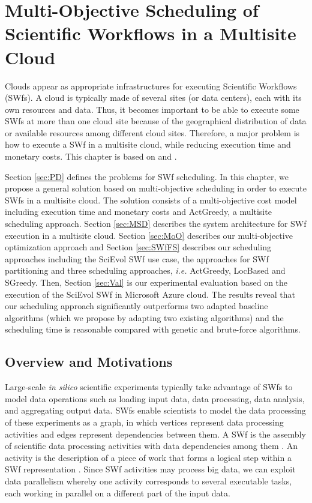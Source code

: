 \chapter{Multi-Objective Scheduling of Scientific Workflows in a Multisite Cloud} \label{MOSSWMC}


Clouds appear as appropriate infrastructures for executing Scientific Workflows (SWfs). 
A cloud is typically made of several sites (or data centers), each with its own resources and data.
Thus, it becomes important to be able to execute some SWfs at more than one cloud site because of the geographical distribution of data or available resources among different cloud sites.
Therefore, a major problem is how to execute a SWf in a multisite cloud, while reducing execution time and monetary costs. This chapter is based on \cite{Liu16} and \cite{Liu2016a}.

Section \ref{sec:PD} defines the problems for SWf scheduling. 
In this chapter, we propose a general solution based on multi-objective scheduling in order to execute SWfs in a multisite cloud. 
The solution consists of a multi-objective cost model including execution time and monetary costs and ActGreedy, a multisite scheduling approach. 
Section \ref{sec:MSD} describes the system architecture for SWf execution in a multisite cloud.
Section \ref{sec:MoO} describes our multi-objective optimization approach and
Section \ref{sec:SWfFS} describes our scheduling approaches including the SciEvol SWf use case, the approaches for SWf partitioning and three scheduling approaches, \textit{i.e.} ActGreedy, LocBased and SGreedy. 
Then, Section \ref{sec:Val} is our experimental evaluation based on the execution of the SciEvol SWf in Microsoft Azure cloud.
The results reveal that our scheduling approach significantly outperforms two adapted baseline algorithms (which we propose by adapting two existing algorithms) and the scheduling time is reasonable compared with genetic and brute-force algorithms. 


\section{Overview and Motivations}

Large-scale \textit{in silico} scientific experiments typically take advantage of SWfs to model data operations such as loading input data, data processing, data analysis, and aggregating output data.
SWfs enable scientists to model the data processing of these experiments as a graph, in which vertices represent data processing activities and edges represent dependencies between them. A SWf is the assembly of scientific
data processing activities with data dependencies among them \cite{Deelman2009}. An activity is the description of a piece of work that forms a logical step within a SWf representation \cite{Liu2015}. 
Since SWf activities may process big data, we can exploit data parallelism whereby one activity corresponds to several executable tasks, each working in parallel on a different part of the input data.

